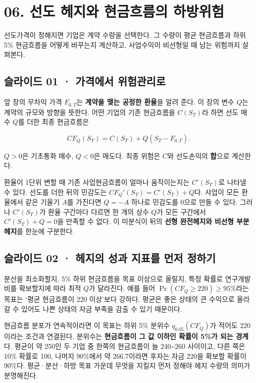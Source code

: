 \documentclass[11pt,a4paper]{article}
\begin{document}
\section{06. 선도 헤지와 현금흐름의 하방위험}
선도가격이 정해지면 기업은 계약 수량을 선택한다. 그 수량이 평균 현금흐름과 하위 5\% 현금흐름을 어떻게 바꾸는지 계산하고, 사업수익이 비선형일 때 남는 위험까지 살펴본다.\par

\subsection{슬라이드 01 · 가격에서 위험관리로}
앞 장의 무차익 가격 $F_{0,T}$는 \textbf{계약을 맺는 공정한 환율}을 알려 준다. 이 장의 변수 $Q$는 계약의 규모와 방향을 뜻한다. 어떤 기업의 기존 현금흐름을 $C(S_T)$라 하면 선도 매수 $Q$를 더한 최종 현금흐름은\par

\[
CF_Q(S_T)=C(S_T)+Q(S_T-F_{0,T}).
\]

$Q>0$은 기초통화 매수, $Q<0$은 매도다. 최종 위험은 $C$와 선도손익의 \textbf{합}으로 계산한다.\par

환율이 1단위 변할 때 기존 사업현금흐름이 얼마나 움직이는지는 $C'(S_T)$로 나타낼 수 있다. 선도를 더한 뒤의 민감도는 $CF_Q'(S_T)=C'(S_T)+Q$다. 사업이 모든 환율에서 같은 기울기 $A$를 가진다면 $Q=-A$ 하나로 민감도를 0으로 만들 수 있다. 그러나 $C'(S_T)$가 환율 구간마다 다르면 한 개의 상수 $Q$가 모든 구간에서 $C'(S_T)+Q=0$을 만족할 수 없다. 이 미분식이 뒤의 \textbf{선형 완전헤지와 비선형 부분헤지}를 한눈에 구분한다.\par

\subsection{슬라이드 02 · 헤지의 성과 지표를 먼저 정하기}
분산을 최소화할지, 5\% 하위 현금흐름을 목표 이상으로 올릴지, 특정 확률로 연구개발비를 확보할지에 따라 최적 $Q$가 달라진다. 예를 들어 $\Pr(CF_Q\geq220)\geq95\%$라는 목표는 ‘평균 현금흐름이 220 이상’보다 강하다. 평균은 좋은 상태의 큰 수익으로 올라갈 수 있어도 나쁜 상태의 자금 부족을 감출 수 있기 때문이다.\par

현금흐름 분포가 연속적이라면 이 목표는 하위 5\% 분위수 $q_{0.05}(CF_Q)$가 적어도 220이라는 조건과 연결된다. 분위수는 \textbf{현금흐름이 그 값 이하인 확률이 5\%가 되는 경계}다. 평균이 약 250인 두 기업 중 한쪽의 현금흐름이 늘 240\~{}260 사이이고, 다른 쪽은 10\% 확률로 100, 나머지 90\%에서 약 266.7이라면 후자는 자금 220을 확보할 확률이 90\%다. 평균·분산·하방 목표 가운데 무엇을 지킬지 먼저 정해야 헤지 수량의 의미가 분명해진다.\par
\end{document}
